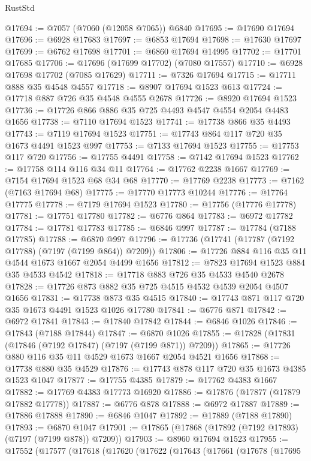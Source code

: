 \begin{lexlean}{RustStd}
\begin{coremodule}
@17694 := @7057 (@7060 (@12058 @7065)) @6840
@17695 := @17690 @17694
@17696 := @6928 @17683
@17697 := @6853 @17694
@17698 := @17630 @17697
@17699 := @6762 @17698
@17701 := @6860 @17694 @14995
@17702 := @17701 @17685
@17706 := @17696 (@17699 @17702) (@7080 @17557)
@17710 := @6928 @17698 @17702 (@7085 @17629)
@17711 := @7326 @17694
@17715 := @17711 @888 @35 @4548 @4557
@17718 := @8907 @17694 @1523 @613
@17724 := @17718 @887 @726 @35 @4548 @4555 @2678
@17726 := @8920 @17694 @1523
@17736 := @17726 @866 @886 @35 @725 @4493 @4547 @4554 @2054 @4483 @1656
@17738 := @7110 @17694 @1523
@17741 := @17738 @866 @35 @4493
@17743 := @7119 @17694 @1523
@17751 := @17743 @864 @117 @720 @35 @1673 @4491 @1523 @997
@17753 := @7133 @17694 @1523
@17755 := @17753 @117 @720
@17756 := @17755 @4491
@17758 := @7142 @17694 @1523
@17762 := @17758 @114 @116 @34 @11
@17764 := @17762 @2238 @1667
@17769 := @7154 @17694 @1523 @68 @34 @68
@17770 := @17769 @2238
@17773 := @7162 (@7163 @17694 @68)
@17775 := @17770 @17773 @10244
@17776 := @17764 @17775
@17778 := @7179 @17694 @1523
@17780 := @17756 (@17776 @17778)
@17781 := @17751 @17780
@17782 := @6776 @864
@17783 := @6972 @17782
@17784 := @17781 @17783
@17785 := @6846 @997
@17787 := @17784 (@7188 @17785)
@17788 := @6870 @997
@17796 := @17736 (@17741 (@17787 (@7192 @17788) (@7197 (@7199 @864)) @7209))
@17806 := @17726 @884 @116 @35 @11 @4544 @1673 @1667 @2054 @4499 @1656
@17812 := @7823 @17694 @1523 @884 @35 @4533 @4542
@17818 := @17718 @883 @726 @35 @4533 @4540 @2678
@17828 := @17726 @873 @882 @35 @725 @4515 @4532 @4539 @2054 @4507 @1656
@17831 := @17738 @873 @35 @4515
@17840 := @17743 @871 @117 @720 @35 @1673 @4491 @1523 @1026 @17780
@17841 := @6776 @871
@17842 := @6972 @17841
@17843 := @17840 @17842
@17844 := @6846 @1026
@17846 := @17843 (@7188 @17844)
@17847 := @6870 @1026
@17855 := @17828 (@17831 (@17846 (@7192 @17847) (@7197 (@7199 @871)) @7209))
@17865 := @17726 @880 @116 @35 @11 @4529 @1673 @1667 @2054 @4521 @1656
@17868 := @17738 @880 @35 @4529
@17876 := @17743 @878 @117 @720 @35 @1673 @4385 @1523 @1047
@17877 := @17755 @4385
@17879 := @17762 @4383 @1667
@17882 := @17769 @4383 @17773 @16920
@17886 := @17876 (@17877 (@17879 @17882 @17778))
@17887 := @6776 @878
@17888 := @6972 @17887
@17889 := @17886 @17888
@17890 := @6846 @1047
@17892 := @17889 (@7188 @17890)
@17893 := @6870 @1047
@17901 := @17865 (@17868 (@17892 (@7192 @17893) (@7197 (@7199 @878)) @7209))
@17903 := @8960 @17694 @1523
@17955 := @17552
    (@17577
      (@17618
        (@17620
          (@17622
            (@17643
              (@17661
                (@17678
                  (@17695

\end{coremodule}
\end{lexlean}
